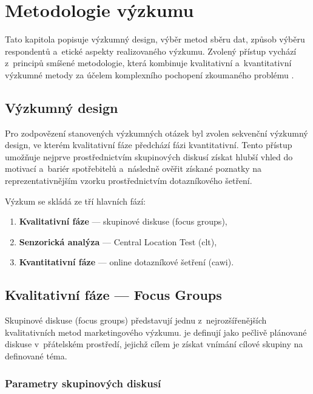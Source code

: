\chapter{Metodologie výzkumu}
\label{chap:methodology}

Tato kapitola popisuje výzkumný design, výběr metod sběru dat, způsob výběru respondentů a~etické aspekty realizovaného výzkumu. Zvolený přístup vychází z~principů smíšené metodologie, která kombinuje kvalitativní a~kvantitativní výzkumné metody za účelem komplexního pochopení zkoumaného problému \parencite{creswell_2018}.

\section{Výzkumný design}
\label{sec:meth_design}

Pro zodpovězení stanovených výzkumných otázek byl zvolen sekvenční výzkumný design, ve kterém kvalitativní fáze předchází fázi kvantitativní. Tento přístup umožňuje nejprve prostřednictvím skupinových diskusí získat hlubší vhled do motivací a~bariér spotřebitelů a~následně ověřit získané poznatky na reprezentativnějším vzorku prostřednictvím dotazníkového šetření.

Výzkum se skládá ze tří hlavních fází:
\begin{enumerate}
  \item \textbf{Kvalitativní fáze} — skupinové diskuse (focus groups),
  \item \textbf{Senzorická analýza} — Central Location Test (\gls{clt}),
  \item \textbf{Kvantitativní fáze} — online dotazníkové šetření (\gls{cawi}).
\end{enumerate}

\section{Kvalitativní fáze — Focus Groups}
\label{sec:meth_focus_groups}

Skupinové diskuse (focus groups) představují jednu z~nejrozšířenějších kvalitativních metod marketingového výzkumu. \textcite{krueger_casey_2015} je definují jako pečlivě plánované diskuse v~přátelském prostředí, jejichž cílem je získat vnímání cílové skupiny na definované téma.

\subsection{Parametry skupinových diskusí}

